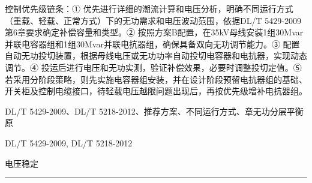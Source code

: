 \documentclass[12pt,a4paper]{ctexart}
\begin{document}
\begin{description}[leftmargin=1.5em,style=nextline,font=\normalfont]
控制优先级链条：① 优先进行详细的潮流计算和电压分析，明确不同运行方式（重载、轻载、正常方式）下的无功需求和电压波动范围，依据DL/T 5429-2009第6章要求确定补偿容量和类型。② 按照方案B配置，在35kV母线安装1组30Mvar并联电容器组和1组30Mvar并联电抗器组，确保具备双向无功调节能力。③ 配置自动无功投切装置，根据母线电压或无功功率自动投切电容器和电抗器，实现动态调节。④ 投运后进行电压和无功实测，验证补偿效果，必要时调整投切定值。⑤ 若采用分阶段策略，则先实施电容器组安装，并在设计阶段预留电抗器组的基础、开关柜及控制电缆接口，待轻载电压越限问题出现后，再按优先级增补电抗器组。
  \item[KW:] DL/T 5429-2009、DL/T 5218-2012、推荐方案、不同运行方式、章无功分层平衡原
  \item[Std:] DL/T 5429-2009, DL/T 5218-2012
  \item[Topic:] 电压稳定
\end{description}
\vspace{4pt}
\hrule\vspace{6pt}
\end{document}
